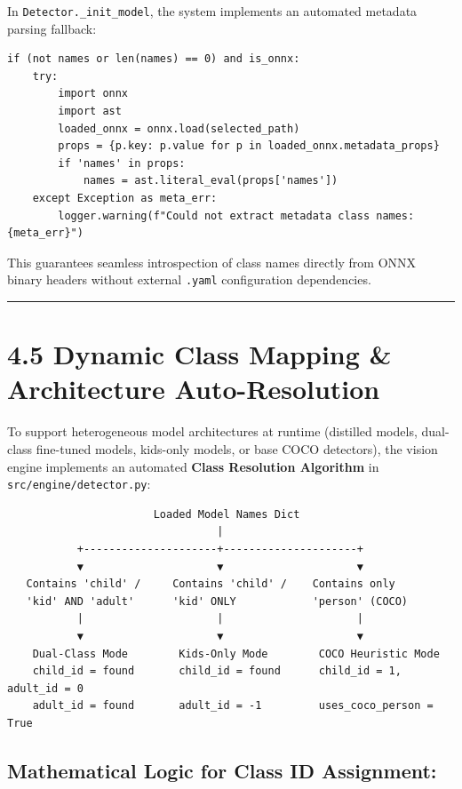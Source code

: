 In \texttt{Detector.\_init\_model}, the system implements an automated
metadata parsing fallback:

\begin{verbatim}
if (not names or len(names) == 0) and is_onnx:
    try:
        import onnx
        import ast
        loaded_onnx = onnx.load(selected_path)
        props = {p.key: p.value for p in loaded_onnx.metadata_props}
        if 'names' in props:
            names = ast.literal_eval(props['names'])
    except Exception as meta_err:
        logger.warning(f"Could not extract metadata class names: {meta_err}")
\end{verbatim}

This guarantees seamless introspection of class names directly from ONNX
binary headers without external \texttt{.yaml} configuration
dependencies.

\begin{center}\rule{0.5\linewidth}{0.5pt}\end{center}

\section{4.5 Dynamic Class Mapping \& Architecture
Auto-Resolution}\label{dynamic-class-mapping-architecture-auto-resolution}

To support heterogeneous model architectures at runtime (distilled
models, dual-class fine-tuned models, kids-only models, or base COCO
detectors), the vision engine implements an automated \textbf{Class
Resolution Algorithm} in \texttt{src/engine/detector.py}:

\begin{verbatim}
                       Loaded Model Names Dict
                                 |
           +---------------------+---------------------+
           ▼                     ▼                     ▼
   Contains 'child' /     Contains 'child' /    Contains only
   'kid' AND 'adult'      'kid' ONLY            'person' (COCO)
           |                     |                     |
           ▼                     ▼                     ▼
    Dual-Class Mode        Kids-Only Mode        COCO Heuristic Mode
    child_id = found       child_id = found      child_id = 1, adult_id = 0
    adult_id = found       adult_id = -1         uses_coco_person = True
\end{verbatim}

\subsection{Mathematical Logic for Class ID
Assignment:}\label{mathematical-logic-for-class-id-assignment}

